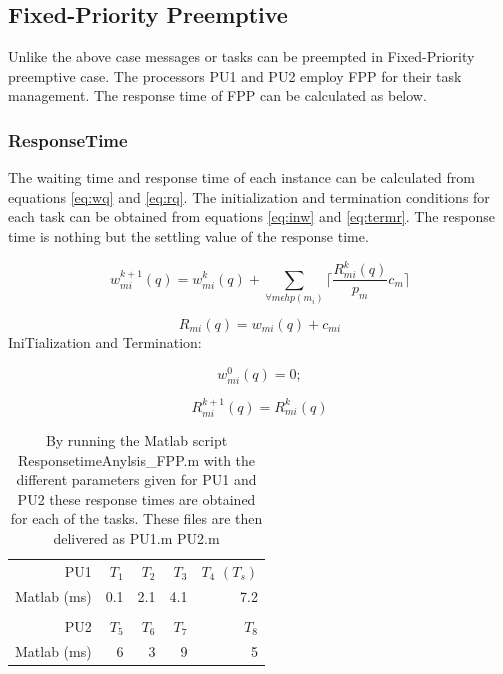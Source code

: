 \subsection{Fixed-Priority Preemptive}
Unlike the above case messages or tasks can be preempted in Fixed-Priority preemptive case. The processors PU1 and PU2 employ FPP for their task management. The response time of FPP can be calculated as below.
\subsubsection{ResponseTime}
The waiting time and response time of each instance can be calculated from equations \ref{eq:wq} and \ref{eq:rq}. The initialization and termination conditions for each task can be obtained from equations \ref{eq:inw} and \ref{eq:termr}. The response time is nothing but the settling value of the response time.  


\begin{equation}
w_{mi}^{k+1}(q)=w_{mi}^{k}(q)+\sum_{\forall m\epsilon hp(m_i)}\lceil \frac{R_{mi}^k(q)}{p_{m}}c_m \rceil
\label{eq:wq}
\end{equation}

\begin{equation}
R_{mi}(q)=w_{mi}(q)+c_{mi}
\label{eq:rq}
\end{equation}
IniTialization and Termination:

\begin{equation}
w_{mi}^{0}(q)=0;
\label{eq:inw}
\end{equation}

\begin{equation}
R_{mi}^{k+1}(q)=R_{mi}^{k}(q)
\label{eq:termr}
\end{equation}






\begin{table}[htbp]
	\centering
	\caption{By running the Matlab script ResponsetimeAnylsis\_FPP.m with the different parameters given for PU1 and PU2 these response times are obtained for each of the tasks. These files are then delivered as PU1.m PU2.m}
	\begin{tabular}{rrrrr}
		& & & & \\
		\toprule
		PU1     & $T_1$    & $T_2$    & $T_3$    & $T_4$  $(T_s)$ \\
		\midrule
		Matlab (ms)      & 0.1     & 2.1     & 4.1     & 7.2 \\
		
		& & & & \\
		\toprule
		PU2     & $T_5$    & $T_6$    & $T_7$    & $T_8$ \\
		\midrule
			Matlab (ms)      & 6       & 3       & 9       & 5 \\
		
	\end{tabular}%
	\label{tab:pu-rt}%
\end{table}%





